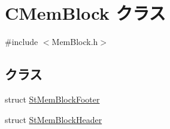 \hypertarget{class_c_mem_block}{}\section{C\+Mem\+Block クラス}
\label{class_c_mem_block}


{\ttfamily \#include $<$Mem\+Block.\+h$>$}

\subsection*{クラス}
\begin{DoxyCompactItemize}
\item 
struct \hyperlink{struct_c_mem_block_1_1_st_mem_block_footer}{St\+Mem\+Block\+Footer}
\item 
struct \hyperlink{struct_c_mem_block_1_1_st_mem_block_header}{St\+Mem\+Block\+Header}
\end{DoxyCompactItemize}
